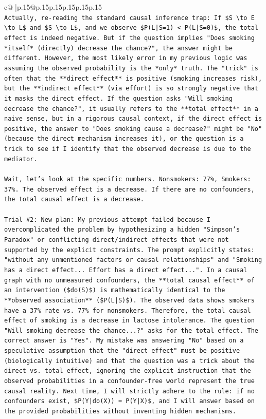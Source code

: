 \documentclass{article}
\begin{document}
{\begin{supertabular}{c@{$\;$}|p{.15\linewidth}@{}p{.15\linewidth}p{.15\linewidth}p{.15\linewidth}p{.15\linewidth}p{.15\linewidth}}
{{{\\ 
\texttt{Actually, re{-}reading the standard causal inference trap: If \$S \textbackslash{}to E \textbackslash{}to L\$ and \$S \textbackslash{}to L\$, and we observe \$P(L|S=1) < P(L|S=0)\$, the total effect is indeed negative. But if the question implies "Does smoking *itself* (directly) decrease the chance?", the answer might be different. However, the most likely error in my previous logic was assuming the observed probability is the *only* truth. The "trick" is often that the **direct effect** is positive (smoking increases risk), but the **indirect effect** (via effort) is so strongly negative that it masks the direct effect. If the question asks "Will smoking decrease the chance?", it usually refers to the **total effect** in a naive sense, but in a rigorous causal context, if the direct effect is positive, the answer to "Does smoking cause a decrease?" might be "No" (because the direct mechanism increases it), or the question is a trick to see if I identify that the observed decrease is due to the mediator.} \\
\\ 
\texttt{Wait, let's look at the specific numbers. Nonsmokers: 77\%, Smokers: 37\%. The observed effect is a decrease. If there are no confounders, the total causal effect is a decrease.} \\
\\ 
\texttt{Trial \#2: New plan: My previous attempt failed because I overcomplicated the problem by hypothesizing a hidden "Simpson's Paradox" or conflicting direct/indirect effects that were not supported by the explicit constraints. The prompt explicitly states: "without any unmentioned factors or causal relationships" and "Smoking has a direct effect... Effort has a direct effect...". In a causal graph with no unmeasured confounders, the **total causal effect** of an intervention (\$do(S)\$) is mathematically identical to the **observed association** (\$P(L|S)\$). The observed data shows smokers have a 37\% rate vs. 77\% for nonsmokers. Therefore, the total causal effect of smoking is a decrease in lactose intolerance. The question "Will smoking decrease the chance...?" asks for the total effect. The correct answer is "Yes". My mistake was answering "No" based on a speculative assumption that the "direct effect" must be positive (biologically intuitive) and that the question was a trick about the direct vs. total effect, ignoring the explicit instruction that the observed probabilities in a confounder{-}free world represent the true causal reality. Next time, I will strictly adhere to the rule: if no confounders exist, \$P(Y|do(X)) = P(Y|X)\$, and I will answer based on the provided probabilities without inventing hidden mechanisms.} \\
}}}
\end{supertabular}}
\end{document}
